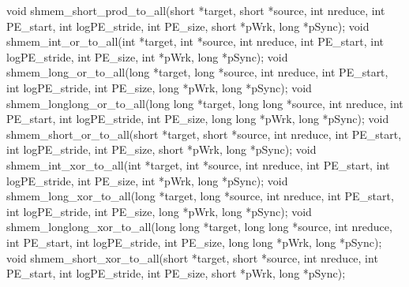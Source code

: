 void shmem_short_prod_to_all(short *target, short *source, int nreduce, int PE_start, int logPE_stride, int PE_size, short *pWrk, long *pSync);
void shmem_int_or_to_all(int *target, int *source, int nreduce, int PE_start, int logPE_stride, int PE_size, int *pWrk, long *pSync);
void shmem_long_or_to_all(long *target, long *source, int nreduce, int PE_start, int logPE_stride, int PE_size, long *pWrk, long *pSync);
void shmem_longlong_or_to_all(long long *target, long long *source, int nreduce, int PE_start, int logPE_stride, int PE_size, long long *pWrk, long *pSync);
void shmem_short_or_to_all(short *target, short *source, int nreduce, int PE_start, int logPE_stride, int PE_size, short *pWrk, long *pSync);
void shmem_int_xor_to_all(int *target, int *source, int nreduce, int PE_start, int logPE_stride, int PE_size, int *pWrk, long *pSync);
void shmem_long_xor_to_all(long *target, long *source, int nreduce, int PE_start, int logPE_stride, int PE_size, long *pWrk, long *pSync);
void shmem_longlong_xor_to_all(long long *target, long long *source, int nreduce, int PE_start, int logPE_stride, int PE_size, long long *pWrk, long *pSync);
void shmem_short_xor_to_all(short *target, short *source, int nreduce, int PE_start, int logPE_stride, int PE_size, short *pWrk, long *pSync); %

\cbstart \synF %

